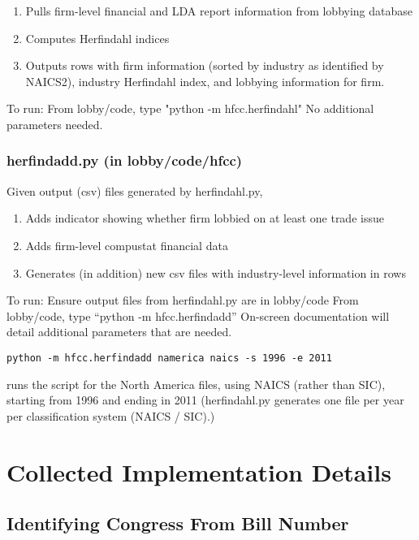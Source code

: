 \documentclass[11pt,letterpaper]{article}
\theoremstyle{plain}
\begin{document}
\begin{enumerate}
\item Pulls firm-level financial and LDA report information from
  lobbying database
\item Computes Herfindahl indices
\item Outputs rows with firm information (sorted by industry as
  identified by NAICS2), industry Herfindahl index, and lobbying
  information for firm.

\end{enumerate}

To run: From lobby/code, type "python -m hfcc.herfindahl" No
additional parameters needed.

\bigskip
\subsubsection{herfindadd.py (in lobby/code/hfcc)}

Given output (csv) files generated by herfindahl.py,

\begin{enumerate}
\item Adds indicator showing whether firm lobbied on at least one trade issue
\item Adds firm-level compustat financial data
\item Generates (in addition) new csv files with industry-level information in rows
\end{enumerate}

To run: Ensure output files from herfindahl.py are in lobby/code From
lobby/code, type ``python -m hfcc.herfindadd'' On-screen documentation
will detail additional parameters that are needed.

\bigskip
{}
\begin{verbatim}
python -m hfcc.herfindadd namerica naics -s 1996 -e 2011
\end{verbatim}
runs the script for the North America files, using NAICS (rather than
SIC), starting from 1996 and ending in 2011 (herfindahl.py generates
one file per year per classification system (NAICS / SIC).)



\section{Collected Implementation Details}

\subsection{Identifying Congress From Bill Number}
\end{document}
